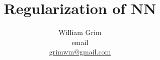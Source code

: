 \documentclass{article}
\begin{document}
\title {Regularization of NN}
\author{William Grim \\ email \\ \href{mailto:grimwm@gmail.com}{grimwm@gmail.com}}

\maketitle
\end{document}
